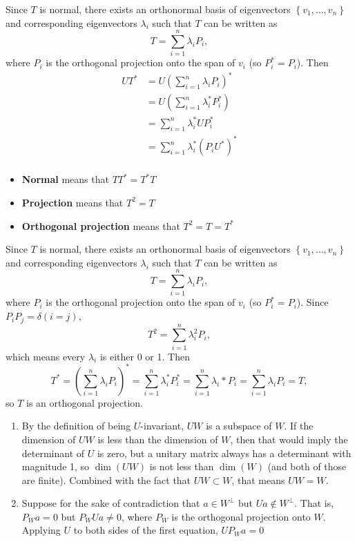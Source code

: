 \documentclass{article}
\begin{document}
\bigskip
\par
\begin{prob}
\end{prob}
Since $T$ is normal, there exists an orthonormal basis of eigenvectors $ \left\{ v_1, \dots, v_n \right\}$ and corresponding eigenvectors $\lambda_i$ such that $T$ can be written as
\[ T = \sum_{i=1}^n \lambda_i P_i, \]
where $P_i$ is the orthogonal projection onto the span of $v_i$ (so $P_i^*=P_i$). Then
\begin{align*}
    UT^* &= U \left( \sum_{i=1}^n \lambda_i P_i \right)^* \\
         &= U \left( \sum_{i=1}^n \lambda_i^* P_i^* \right) \\
         &= \sum_{i=1}^n \lambda_i^* U P_i^* \\
         &= \sum_{i=1}^n \lambda_i^* (P_i U^*)^* \\
\end{align*}

\bigskip
\par
\begin{prob}
\end{prob}
\begin{itemize}
    \item \textbf{Normal} means that $TT^*=T^*T$
    \item \textbf{Projection} means that $T^2=T$
    \item \textbf{Orthogonal projection} means that $T^2=T=T^*$
\end{itemize}
Since $T$ is normal, there exists an orthonormal basis of eigenvectors $ \left\{ v_1, \dots, v_n \right\}$ and corresponding eigenvectors $\lambda_i$ such that $T$ can be written as
\[ T = \sum_{i=1}^n \lambda_i P_i, \]
where $P_i$ is the orthogonal projection onto the span of $v_i$ (so $P_i^*=P_i$). Since $P_i P_j = \delta(i = j)$,
\[ T^2 = \sum_{i=1}^n \lambda_i^2 P_i, \]
which means every $\lambda_i$ is either 0 or 1. Then
\[ T^* = \left( \sum_{i=1}^n \lambda_i P_i \right)^* = \sum_{i=1}^n \lambda_i^* P_i^* = \sum_{i=1}^n \lambda_i* P_i = \sum_{i=1}^n \lambda_i P_i = T, \]
so $T$ is an orthogonal projection.

\bigskip
\par
\begin{prob}
\end{prob}
\begin{enumerate}[label=(\alph*)]
    \item By the definition of being $U$-invariant, $UW$ is a subspace of $W$. If the dimension of $UW$ is less than the dimension of $W$, then that would imply the determinant of $U$ is zero, but a unitary matrix always has a determinant with magnitude 1, so $\dim(UW)$ is not less than $\dim(W)$ (and both of those are finite). Combined with the fact that $UW \subset W$, that means $UW=W$.
    \item Suppose for the sake of contradiction that $a \in W^\perp$ but $Ua \not\in W^\perp$. That is, $P_W a = 0$ but $P_W U a \neq 0$, where $P_W$ is the orthogonal projection onto $W$. Applying $U$ to both sides of the first equation, $UP_W a = 0$
\end{enumerate}
\end{document}
